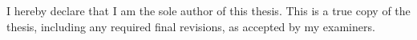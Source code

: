 I hereby declare that I am the sole author of this thesis. This is a true copy of the thesis, including any required final revisions, as accepted by my examiners.

\cleardoublepage




